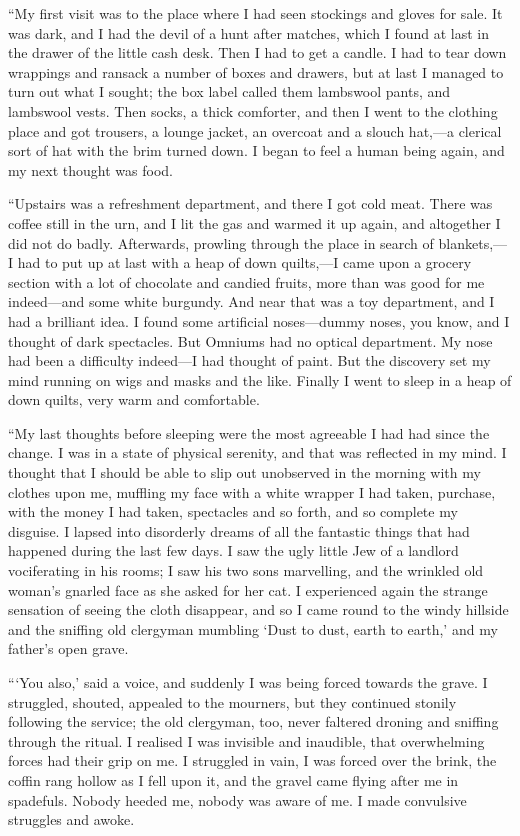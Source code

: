 “My first visit was to the place where I had seen stockings and gloves for sale. It was dark, and I had the devil of a hunt after matches, which I found at last in the drawer of the little cash desk. Then I had to get a candle. I had to tear down wrappings and ransack a number of boxes and drawers, but at last I managed to turn out what I sought; the box label called them lambswool pants, and lambswool vests. Then socks, a thick comforter, and then I went to the clothing place and got trousers, a lounge jacket, an overcoat and a slouch hat,—a clerical sort of hat with the brim turned down. I began to feel a human being again, and my next thought was food.

“Upstairs was a refreshment department, and there I got cold meat. There was coffee still in the urn, and I lit the gas and warmed it up again, and altogether I did not do badly. Afterwards, prowling through the place in search of blankets,—I had to put up at last with a heap of down quilts,—I came upon a grocery section with a lot of chocolate and candied fruits, more than was good for me indeed—and some white burgundy. And near that was a toy department, and I had a brilliant idea. I found some artificial noses—dummy noses, you know, and I thought of dark spectacles. But Omniums had no optical department. My nose had been a difficulty indeed—I had thought of paint. But the discovery set my mind running on wigs and masks and the like. Finally I went to sleep in a heap of down quilts, very warm and comfortable.

“My last thoughts before sleeping were the most agreeable I had had since the change. I was in a state of physical serenity, and that was reflected in my mind. I thought that I should be able to slip out unobserved in the morning with my clothes upon me, muffling my face with a white wrapper I had taken, purchase, with the money I had taken, spectacles and so forth, and so complete my disguise. I lapsed into disorderly dreams of all the fantastic things that had happened during the last few days. I saw the ugly little Jew of a landlord vociferating in his rooms; I saw his two sons marvelling, and the wrinkled old woman’s gnarled face as she asked for her cat. I experienced again the strange sensation of seeing the cloth disappear, and so I came round to the windy hillside and the sniffing old clergyman mumbling ‘Dust to dust, earth to earth,’ and my father’s open grave.

“\kern1pt‘You also,’ said a voice, and suddenly I was being forced towards the grave. I struggled, shouted, appealed to the mourners, but they continued stonily following the service; the old clergyman, too, never faltered droning and sniffing through the ritual. I realised I was invisible and inaudible, that overwhelming forces had their grip on me. I struggled in vain, I was forced over the brink, the coffin rang hollow as I fell upon it, and the gravel came flying after me in spadefuls. Nobody heeded me, nobody was aware of me. I made convulsive struggles and awoke.

